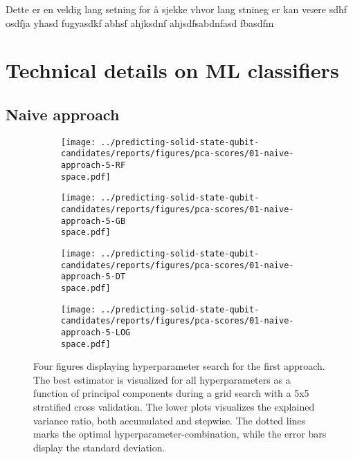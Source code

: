 Dette er en veldig lang setning for å sjekke vhvor lang stnineg er kan veære sdhf osdfja yhasd fugyasdkf abhsf ahjksdnf ahjsdfsabdnfasd fbasdfm

\clearpage

\section{Technical details on ML classifiers}



\subsection{Naive approach}


\begin{figure}[!tbp]
  \begin{subfigure}[b]{0.5\textwidth}
    \texttt{[image: ../predicting-solid-state-qubit-candidates/reports/figures/pca-scores/01-naive-approach-5-RF\\space.pdf]}
    \caption{}
    \label{fig:q1-GB}
  \end{subfigure}%
  \hfill
  \begin{subfigure}[b]{0.5\textwidth}
    \texttt{[image: ../predicting-solid-state-qubit-candidates/reports/figures/pca-scores/01-naive-approach-5-GB\\space.pdf]}
    \caption{}
    \label{fig:q1-RF}
  \end{subfigure}

  \begin{subfigure}[b]{0.5\textwidth}
    \texttt{[image: ../predicting-solid-state-qubit-candidates/reports/figures/pca-scores/01-naive-approach-5-DT\\space.pdf]}
    \caption{}
    \label{fig:q1-DT}
  \end{subfigure}%
  \hfill
  \begin{subfigure}[b]{0.5\textwidth}
    \texttt{[image: ../predicting-solid-state-qubit-candidates/reports/figures/pca-scores/01-naive-approach-5-LOG\\space.pdf]}
    \caption{}
    \label{fig:q1-LOG}
  \end{subfigure}
  \caption{{Four figures displaying hyperparameter search for the first approach. The best estimator is visualized for all hyperparameters as a function of principal components during a grid search with a 5x5 stratified cross validation. The lower plots visualizes the explained variance ratio, both accumulated and stepwise. The dotted lines marks the optimal hyperparameter-combination, while the error bars display the standard deviation. }}
\end{figure}

